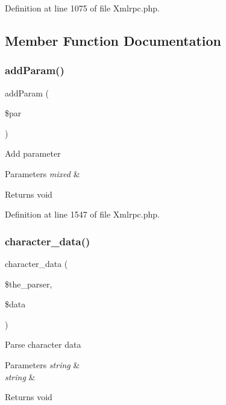 Definition at line 1075 of file Xmlrpc.\+php.



\subsection{Member Function Documentation}
\mbox{\label{class_x_m_l___r_p_c___message_a8000e3ae75e90052e5ee10febb9ce2d0}} 
\subsubsection{\texorpdfstring{addParam()}{addParam()}}
{\footnotesize\ttfamily add\+Param (\begin{DoxyParamCaption}\item[{}]{\$par }\end{DoxyParamCaption})}

Add parameter


\begin{DoxyParams}{Parameters}
{\em mixed} & \\
\hline
\end{DoxyParams}
\begin{DoxyReturn}{Returns}
void 
\end{DoxyReturn}


Definition at line 1547 of file Xmlrpc.\+php.

\mbox{\label{class_x_m_l___r_p_c___message_ae10d173fc93c23cb233ff01acb2afbe2}} 
\subsubsection{\texorpdfstring{character\_data()}{character\_data()}}
{\footnotesize\ttfamily character\+\_\+data (\begin{DoxyParamCaption}\item[{}]{\$the\+\_\+parser,  }\item[{}]{\$data }\end{DoxyParamCaption})}

Parse character data


\begin{DoxyParams}{Parameters}
{\em string} & \\
\hline
{\em string} & \\
\hline
\end{DoxyParams}
\begin{DoxyReturn}{Returns}
void 
\end{DoxyReturn}


